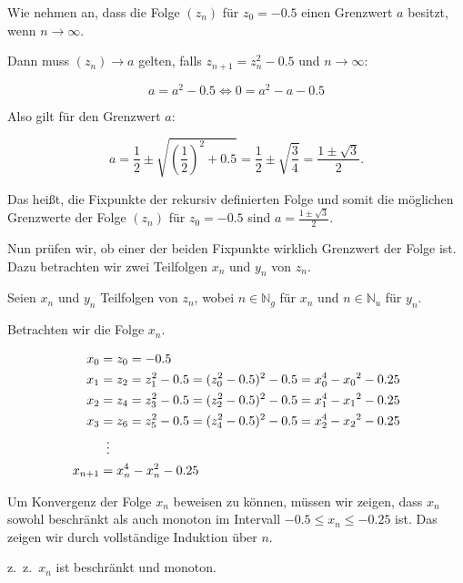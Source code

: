 \documentclass[a4paper, 12pt]{book}
\begin{document}
Wie nehmen an, dass die Folge \(\left( z_{n} \right)\) für
\(z_{0} =  -0.5\) einen Grenzwert \(a\) besitzt, wenn
\(n \rightarrow \infty\).

Dann muss $(z_n)\to a$ gelten, falls $z_{n + 1} = z_{n}^{2} - 0.5$ und $n\to\infty$:

\[a = a^{2} - 0.5 \Longleftrightarrow 0 = a^{2} - a - 0.5\]

Also gilt für den Grenzwert \(a\):

\[a = \frac{1}{2} \pm \sqrt{\left( \frac{1}{2} \right)^{2} + 0.5} = \frac{1}{2} \pm \sqrt{\frac{3}{4}} = \frac{1 \pm \sqrt{3}}{2}.\]

Das heißt, die Fixpunkte der rekursiv definierten Folge und somit die
möglichen Grenzwerte der Folge \(\left( z_{n} \right)\) für
\(z_{0} =  - 0.5\) sind \(a = \frac{1 \pm \sqrt{3}}{2}\).

Nun prüfen wir, ob einer der beiden Fixpunkte wirklich Grenzwert der
Folge ist. Dazu betrachten wir zwei Teilfolgen \(x_{n}\) und \(y_{n}\)
von \(z_{n}\).

Seien \(x_{n}\) und \(y_{n}\) Teilfolgen von \(z_{n}\), wobei
\(n \in \mathbb{N}_{g}\) für \(x_{n}\) und
\(n \in \mathbb{N}_{u}\) für \(y_{n}\).

Betrachten wir die Folge \(x_{n}\).

\begin{align*}
x_{0} &= z_{0} =  -0.5\\
x_{1} &= z_{2} = z_{1}^{2} - 0.5 = (z_{0}^{2} - 0.5)^{2} - 0.5 = x_{0}^{4} - {x_{0}}^{2} - 0.25\\
x_{2} &= z_{4} = z_{3}^{2} - 0.5 = (z_{2}^{2} - 0.5)^{2} - 0.5 = x_{1}^{4} - {x_{1}}^{2} - 0.25\\
x_{3} &= z_{6} = z_{5}^{2} - 0.5 = (z_{4}^{2} - 0.5)^{2} - 0.5 = x_{2}^{4} - {x_{2}}^{2} - 0.25\\
&\vdotswithin{=} \\
x_{n + 1} &= x_{n}^{4} - x_{n}^{2} - 0.25
\end{align*}

Um Konvergenz der Folge \(x_{n}\) beweisen zu können, müssen wir zeigen,
dass \(x_{n}\) sowohl beschränkt als auch monoton im Intervall
\(- 0.5\leq x_{n} \leq  - 0.25\) ist. Das zeigen wir durch
vollständige Induktion über $n$.

z.~z.~\(x_{n}\) ist beschränkt und monoton.
\end{document}
